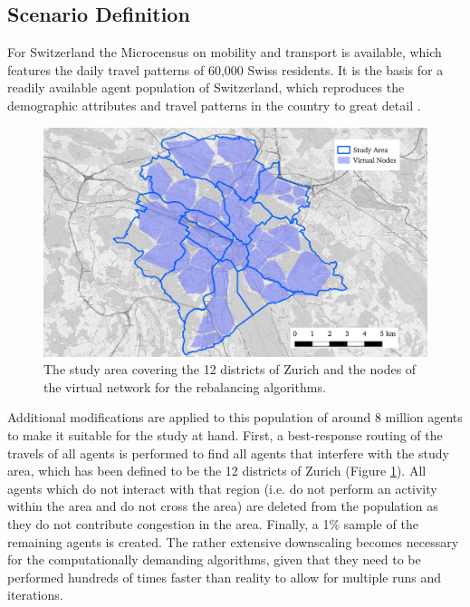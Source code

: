 
\subsection{Scenario Definition}

For Switzerland the Microcensus on mobility and transport \cite{microcensus} is
available, which features the daily travel patterns of 60,000 Swiss residents.
It is the basis for a readily available agent population of
Switzerland, which reproduces the demographic attributes and travel patterns
in the country to great detail \cite{ivtbaseline}.

\begin{figure}[h]
\begin{center}\includegraphics[width=1.0\textwidth]{figures/map.pdf}\end{center}
\caption{The study area covering the 12 districts of Zurich and the nodes of the
virtual network for the rebalancing algorithms.}
\label{fig:study_area_vnodes}
\end{figure}

Additional modifications are applied to this population of around 8 million
agents to make it suitable for the study at hand. First, a best-response routing
of the travels of all agents is performed to find all agents that interfere
with the study area, which has been defined to be the 12 districts of Zurich (Figure \ref{fig:study_area_vnodes}).
All agents which do not interact with that region (i.e. do not perform an activity within
the area and do not cross the area) are deleted from the population as they do
not contribute congestion in the area. Finally, a 1\%
sample of the remaining agents is created. The rather extensive downscaling becomes necessary for the computationally
demanding algorithms, given that they need to be performed hundreds of times faster
than reality to allow for multiple runs and iterations.


